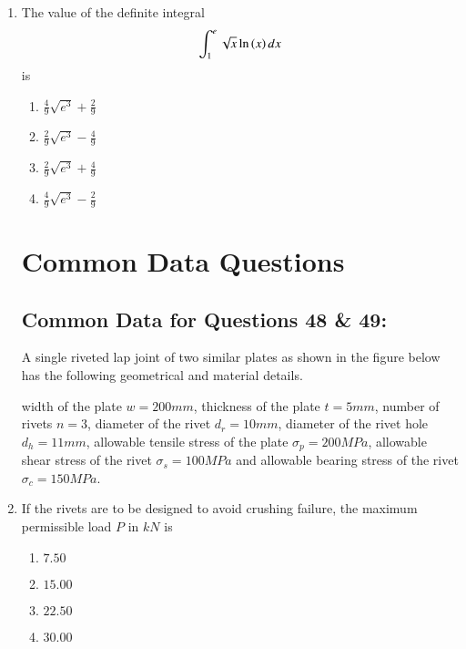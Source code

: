 \documentclass[journal]{IEEEtran}
\numberwithin{equation}{enumi}
\numberwithin{figure}{enumi}
\begin{document}
\begin{enumerate}
    \item 
    The value of the definite integral
    \begin{align*}
        \int_1^e \sqrt{x}\ln{\ensuremath{\left(x\right)}}\, dx
    \end{align*}
    is

    \begin{multicols}{4}
        \begin{enumerate}
            \item $\frac{4}{9}\sqrt{e^3} + \frac{2}{9}$
            \item $\frac{2}{9}\sqrt{e^3} - \frac{4}{9}$
            \item $\frac{2}{9}\sqrt{e^3} + \frac{4}{9}$
            \item $\frac{4}{9}\sqrt{e^3} - \frac{2}{9}$
        \end{enumerate}
    \end{multicols}

    \section{Common Data Questions}
    \subsection{Common Data for Questions 48 \& 49:}
    A single riveted lap joint of two similar plates as shown in the figure below has the following geometrical
    and material details.


    width of the plate $w = 200 mm$, thickness of the plate $t = 5 mm$, number of rivets $n = 3$, diameter of the rivet $d_r = 10 mm$, diameter of the rivet hole $d_h = 11 mm$, allowable tensile stress of the plate $\sigma_p = 200 MPa$, allowable shear stress of the rivet $\sigma_s = 100 MPa$ and allowable bearing stress of the rivet $\sigma_c = 150 MPa$.\\

    \begin{figure}[H]
    \centering
    \resizebox{0.8\textwidth}{!}{}%

\label{fig:my_label}
\end{figure}

    \item 
    If the rivets are to be designed to avoid crushing failure, the maximum permissible load $P$ in $kN$ is

    \begin{multicols}{4}
        \begin{enumerate}
            \item $7.50$
            \item $15.00$
            \item $22.50$
            \item $30.00$
        \end{enumerate}
    \end{multicols}


\end{enumerate}
\end{document}
